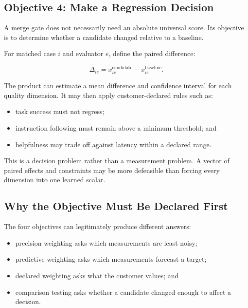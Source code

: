 \documentclass[11pt]{article}
\begin{document}
\subsection{Objective 4: Make a Regression Decision}

A merge gate does not necessarily need an absolute universal score. Its
objective is to determine whether a candidate changed relative to a baseline.

For matched case \(i\) and evaluator \(e\), define the paired difference:

\begin{equation}
\Delta_{ie}
=
x_{ie}^{\mathrm{candidate}}
- x_{ie}^{\mathrm{baseline}}.
\end{equation}

The product can estimate a mean difference and confidence interval for each
quality dimension. It may then apply customer-declared rules such as:

\begin{itemize}
    \item task success must not regress;
    \item instruction following must remain above a minimum threshold; and
    \item helpfulness may trade off against latency within a declared range.
\end{itemize}

This is a decision problem rather than a measurement problem. A vector of
paired effects and constraints may be more defensible than forcing every
dimension into one learned scalar.

\subsection{Why the Objective Must Be Declared First}

The four objectives can legitimately produce different answers:

\begin{itemize}
    \item precision weighting asks which measurements are least noisy;
    \item predictive weighting asks which measurements forecast a target;
    \item declared weighting asks what the customer values; and
    \item comparison testing asks whether a candidate changed enough to affect
    a decision.
\end{itemize}
\end{document}
